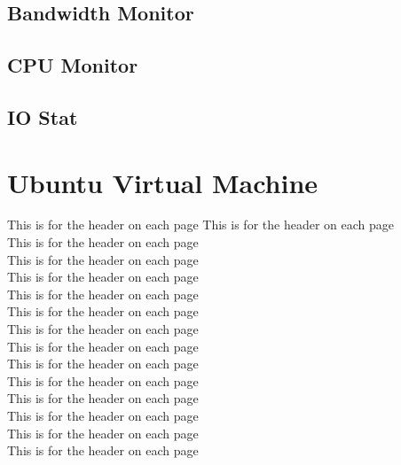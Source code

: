 \subsection{Bandwidth Monitor}
\subsection{CPU Monitor}
\subsection{IO Stat}

\section{Ubuntu Virtual Machine}
This is for the header on each page
This is for the header on each page\\
This is for the header on each page\\
This is for the header on each page\\
This is for the header on each page\\
This is for the header on each page\\
This is for the header on each page\\
This is for the header on each page\\
This is for the header on each page\\
This is for the header on each page\\
This is for the header on each page\\
This is for the header on each page\\
This is for the header on each page\\
This is for the header on each page\\
This is for the header on each page

